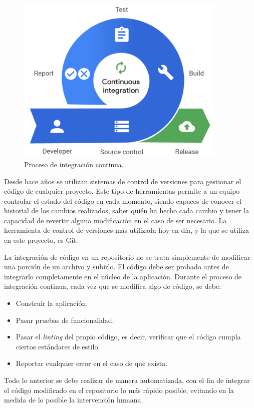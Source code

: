 \begin{figure}
  \centerline{\includegraphics[width=10cm]{figuras/ci}}
  \caption{Proceso de integración continua\cite{img:ci}.}
  \label{fig:ci}
\end{figure}

Desde hace años se utilizan sistemas de control de versiones para gestionar el código de cualquier proyecto. Este tipo de herramientas permite a un equipo controlar el estado del código en cada momento, siendo capaces de conocer el historial de los cambios realizados, saber quién ha hecho cada cambio y tener la capacidad de revertir alguna modificación en el caso de ser necesario. La herramienta de control de versiones más utilizada hoy en día, y la que se utiliza en este proyecto, es Git\cite{git}.

La integración de código en un repositorio no se trata simplemente de modificar una porción de un archivo y subirlo. El código debe ser probado antes de integrarlo completamente en el núcleo de la aplicación. Durante el proceso de integración continua, cada vez que se modifica algo de código, se debe:

\begin{itemize}
  \item Construir la aplicación.
  \item Pasar pruebas de funcionalidad.
  \item Pasar el \textit{linting} del propio código, es decir, verificar que el código cumpla ciertos estándares de estilo.
  \item Reportar cualquier error en el caso de que exista.
\end{itemize}

Todo lo anterior se debe realizar de manera automatizada, con el fin de integrar el código modificado en el repositorio lo más rápido posible, evitando en la medida de lo posible la intervención humana.

